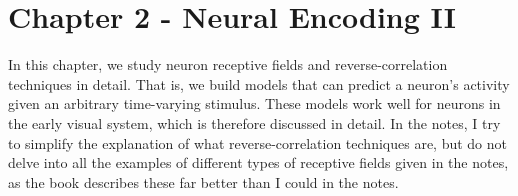 \documentclass{article}
\begin{document}
\begin{figure}[H]
    \centering

\end{figure}

\section{Chapter 2 - Neural Encoding II}

In this chapter, we study neuron receptive fields and reverse-correlation techniques in detail. That is, we build models that can predict a neuron's activity given an arbitrary time-varying stimulus. These models work well for neurons in the early visual system, which is therefore discussed in detail. In the notes, I try to simplify the explanation of what reverse-correlation techniques are, but do not delve into all the examples of different types of receptive fields given in the notes, as the book describes these far better than I could in the notes.
\end{document}
